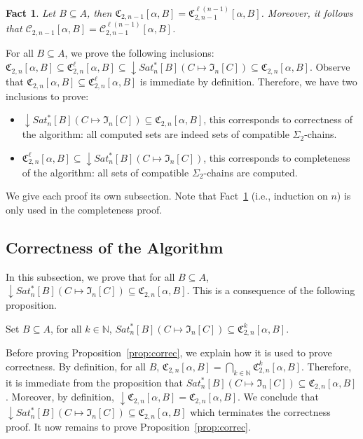 \documentclass[envcountsame]{llncs}
\newcommand\nat{\ensuremath{\mathbb{N}}\xspace}
\newcommand\Cs{\ensuremath{\mathcal{C}}\xspace}
\newcommand\Csgen[3]{\ensuremath{\Cs_{#1,#3}^{#2}}\xspace}
\newcommand\Cstwolen[1]{\ensuremath{\Cs_{2,#1}}\xspace}
\newcommand\fCgen[3]{\ensuremath{\fC_{#1,#3}^{#2}}\xspace}
\newcommand\fCtwolen[1]{\ensuremath{\fC_{2,#1}}\xspace}
\newcommand\fCtwon{\ensuremath{\fC_{2,n}}\xspace}
\newcommand{\sic}[1]{\ensuremath{\Sigma_{#1}}\xspace}
\newcommand\qchains[1]{\ensuremath{\sic{#1}}-chains\xspace}
\newcommand\dchains{\qchains{2}}
\newcommand\fI{\ensuremath{\mathfrak I}\xspace}
\newcommand\fC{\ensuremath{\mathfrak C}\xspace}
\DeclareMathOperator{\downclos}{\downarrow}
\newtheorem{fact}[theorem]{Fact}
\begin{document}
\begin{fact} \label{fct:inducomp}
  Let $B \subseteq A$, then $\fCtwolen{n-1}[\alpha,B] =
  \fCgen{2}{\ell(n-1)}{n-1}[\alpha,B]$. Moreover, it follows that $\Cstwolen{n-1}[\alpha,B] =
  \Csgen{2}{\ell(n-1)}{n-1}[\alpha,B]$.
\end{fact}



For all $B \subseteq A$, we prove the following inclusions:
$\fCtwon[\alpha,B] \subseteq \fCgen2{\ell}{n}[\alpha,B] \subseteq
\downclos Sat^{*}_n[B](C \mapsto \fI_n[C]) \subseteq
\fCtwon[\alpha,B]$. Observe that $\fCtwon[\alpha,B] \subseteq
\fCgen2{\ell}{n}[\alpha,B]$ is immediate by definition. Therefore, we
have two inclusions to prove:
\begin{itemize}
\item $\downclos Sat^{*}_n[B](C \mapsto \fI_n[C]) \subseteq
  \fCtwon[\alpha,B]$, this corresponds to correctness of the
  algorithm: all computed sets are indeed sets of compatible
  \dchains. 
\item $\fCgen2{\ell}{n}[\alpha,B] \subseteq \downclos Sat^{*}_n[B](C
  \mapsto \fI_n[C])$, this corresponds to completeness of the
  algorithm: all sets of compatible \dchains are computed.
\end{itemize}
\noindent
We give each proof its own subsection. Note that
Fact~\ref{fct:inducomp} (i.e., induction on $n$) is
only used in the completeness proof.

\subsection{Correctness of the Algorithm}
In this subsection, we prove that for all $B \subseteq A$, $\downclos
Sat^{*}_n[B](C \mapsto \fI_n[C]) \subseteq \fCtwon[\alpha,B]$. This is
a consequence of the following proposition.

\begin{proposition} \label{prop:correc}
  Set $B \subseteq A$, for all $k \in \nat$, $Sat^{*}_n[B](C \mapsto
  \fI_n[C]) \subseteq \fCgen2{k}{n}[\alpha,B]$.
\end{proposition}

Before proving Proposition~\ref{prop:correc}, we explain how it is
used to prove correctness. By definition, for all $B$,
$\fCtwon[\alpha,B] = \bigcap_{k \in \nat}
\fCgen2{k}{n}[\alpha,B]$. Therefore, it is immediate from the
proposition that $Sat^{*}_n[B](C \mapsto \fI_n[C]) \subseteq
\fCtwon[\alpha,B]$. Moreover, by definition, $\downclos
\fCtwon[\alpha,B] = \fCtwon[\alpha,B]$. We conclude that
$\downclos Sat^{*}_n[B](C \mapsto
\fI_n[C]) \subseteq \fCtwon[\alpha,B]$ which 
terminates the correctness proof. It now remains to prove
Proposition~\ref{prop:correc}.
\end{document}
